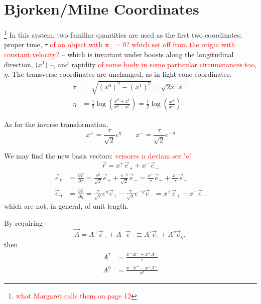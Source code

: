 \section{Bjorken/Milne Coordinates}
\label{ap:bjorken_coordinates}
\footnote{\textcolor{red}{what Margaret calls them on page 12}}
In this system, two familiar quantities are used as the first two coordinates: proper time, $\tau$ \textcolor{red}{of an object with $\mathbf{x}_\perp=0$? which set off from the origin with constant velocity?} -- which is invariant under boosts along the longitudinal direction, ($x^1$) --, and rapidity \textcolor{red}{of some body in some particular circumstances too}, $\eta$. The transverse coordinates are unchanged, as in light-cone coordinates.
\begin{equation}
\begin{split}
	\tau & = \sqrt{(x^0)^2 - (x^1)^2} = \sqrt{2x^+ x^-} \\
	\eta & = \frac{1}{2} \log \left( \frac{x^0+x^1}{x^0-x^1} \right) = \frac{1}{2} \log \left(\frac{x^+}{x^-} \right)
\end{split}
\end{equation}

As for the inverse transformation,
\begin{equation}
	x^+  = \frac{\tau}{\sqrt{2}} e^\eta \qquad
	x^-  = \frac{\tau}{\sqrt{2}} e^{-\eta}
\end{equation}



We may find the new basis vectors: \textcolor{red}{versores n deviam ser "e"}
\begin{equation*}
	\vec{r} =  x^+ \vec{e}_+ + x^- \vec{e}_-
\end{equation*}
\begin{equation}
\begin{split}
	\vec{e}_\tau & = \frac{\partial \vec{r}}{\partial \tau} = \frac{e^\eta}{\sqrt{2}} \vec{e}_+ + \frac{e^{-\eta}}{\sqrt{2}} \vec{e}_- = \frac{x^+}{\tau} \vec{e}_+ + \frac{x^-}{\tau} \vec{e}_- \\
	\vec{e}_\eta & = \frac{\partial \vec{r}}{\partial \eta} = \frac{\tau}{\sqrt{2}} e^\eta \vec{e}_+ - \frac{\tau}{\sqrt{2}}e^{-\eta} \vec{e}_- = x^+ \vec{e}_+ - x^- \vec{e}_-
\end{split}
\end{equation}
\noindent which are not, in general, of unit length.

By requiring
\begin{equation*}
	\vec{A} = A^+ \vec{e}_+ + A^- \vec{e}_- \equiv A^\tau \vec{e}_\tau + A^\eta \vec{e}_\eta, 
\end{equation*}
\noindent then
\begin{equation}
\begin{split}
	A^\tau & = \frac{x^- A^+ + x^+ A^-}{\tau} \\
	A^\eta & = \frac{x^- A^+ - x^+ A^-}{\tau^2}
\end{split}
\end{equation} 

